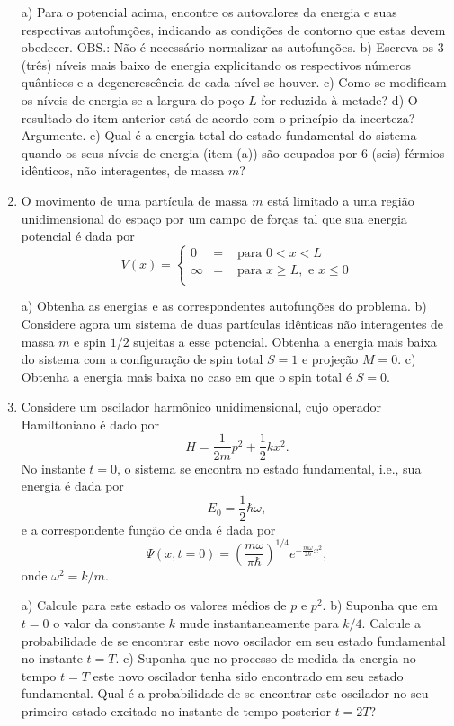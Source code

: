 \begin{enumerate}[start=1,label={\bfseries Q\arabic*.}]
a) Para o potencial acima, encontre os autovalores da energia e suas respectivas autofunções, indicando as condições de contorno que estas devem obedecer. OBS.: Não é necessário normalizar as autofunções.
b) Escreva os 3 (três) níveis mais baixo de energia explicitando os respectivos números quânticos e a degenerescência de cada nível se houver.
c) Como se modificam os níveis de energia se a largura do poço $L$ for reduzida à metade?
d) O resultado do item anterior está de acordo com o princípio da incerteza? Argumente.
e) Qual é a energia total do estado fundamental do sistema quando os seus níveis de energia (item (a)) são ocupados por 6 (seis) férmios idênticos, não interagentes, de massa $m$?






\item O movimento de uma partícula de massa $m$ está limitado a uma região unidimensional do espaço por um campo de forças tal que sua energia potencial é dada por
$$
V(x) = \left\{
  \begin{array}{ccc}
    0 & = & \mbox{ para } 0 < x < L \\
    \infty & = & \mbox{ para } x \geq L, \mbox{ e } x \leq 0 \\
  \end{array}
\right.
$$

a) Obtenha as energias e as correspondentes autofunções do problema.
b) Considere agora um sistema de duas partículas idênticas não interagentes de massa $m$ e spin $1/2$ sujeitas a esse potencial. Obtenha a energia mais baixa do sistema com a conﬁguração de spin total $S = 1$ e projeção $M = 0$.
c) Obtenha a energia mais baixa no caso em que o spin total é $S = 0$.




\item Considere um oscilador harmônico unidimensional, cujo operador Hamiltoniano é dado por
$$
H = \frac{1}{2m}p^{2} + \frac{1}{2} kx^{2}.
$$
No instante $t=0$, o sistema se encontra no estado fundamental, i.e., sua energia é dada por
$$
E_{0} = \frac{1}{2} \hbar \omega ,
$$
e a correspondente função de onda é dada por
$$
\Psi(x, t=0) = \left( \frac{m \omega}{\pi \hbar}  \right)^{1/4} e^{- \frac{m \omega}{2\hbar} x^{2}},
$$
onde $\omega^{2} = k/m$.


  a) Calcule para este estado os valores médios de $p$ e $p^{2}$.
  b) Suponha que em $t = 0$ o valor da constante $k$ mude instantaneamente para $k/4$. Calcule a probabilidade de se encontrar este novo oscilador em seu estado fundamental no instante $t = T$.
  c) Suponha que no processo de medida da energia no tempo $t=T$ este novo oscilador tenha sido encontrado em seu estado fundamental. Qual é a probabilidade de se encontrar este oscilador no seu primeiro estado excitado no instante de tempo posterior $t = 2T$?






\end{enumerate}














